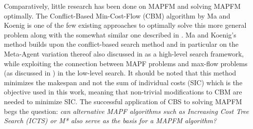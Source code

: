 \documentclass[english,10pt]{article}
\begin{document}
	Comparatively, little research has been done on MAPFM and solving MAPFM optimally.
	The Conflict-Based Min-Cost-Flow (CBM) algorithm by Ma and Koenig \cite{ma2016} is one of the few existing approaches to optimally solve this more general problem along with the somewhat similar one described in \cite{henkel2019}.
	Ma and Koenig's method builds upon the conflict-based search method and in particular on the Meta-Agent variation thereof also discussed in \cite{sharon2015} as a high-level search framework, while exploiting the connection between MAPF problems and max-flow problems (as discussed in \cite{yu2013}) in the low-level search. It should be noted that this method minimizes the makespan and not the sum of individual costs (SIC) which is the objective used in this work, meaning that non-trivial modifications to CBM are needed to minimize SIC.
	The successful application of CBS to solving MAPFM begs the question: \textit{can alternative MAPF algorithms such as Increasing Cost Tree Search (ICTS) \cite{sharon2011} or M* \cite{wagner2011} also serve as the basis for a MAPFM algorithm?}
	
\end{document}
